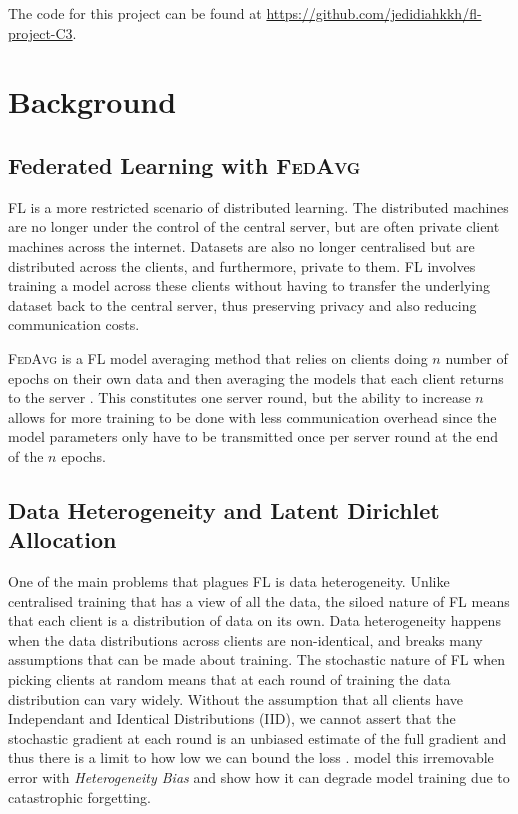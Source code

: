 \documentclass{article}
\newcommand*{\fedavg}{\textsc{FedAvg}}
\begin{document}
The code for this project can be found at \url{https://github.com/jedidiahkkh/fl-project-C3}.

\section{Background}
\subsection{Federated Learning with \fedavg}
FL is a more restricted scenario of distributed learning. The distributed machines are no longer under the control of the central server, but are often private client machines across the internet. Datasets are also no longer centralised but are distributed across the clients, and furthermore, private to them. FL involves training a model across these clients without having to transfer the underlying dataset back to the central server, thus preserving privacy and also reducing communication costs.

\fedavg{} is a FL model averaging method that relies on clients doing $n$ number of epochs on their own data and then averaging the models that each client returns to the server \cite{mcmahanCommunicationEfficientLearningDeep2017}. This constitutes one server round, but the ability to increase $n$ allows for more training to be done with less communication overhead since the model parameters only have to be transmitted once per server round at the end of the $n$ epochs.

\subsection{Data Heterogeneity and Latent Dirichlet Allocation}
One of the main problems that plagues FL is data heterogeneity. Unlike centralised training that has a view of all the data, the siloed nature of FL means that each client is a distribution of data on its own. Data heterogeneity happens when the data distributions across clients are non-identical, and breaks many assumptions that can be made about training. The stochastic nature of FL when picking clients at random means that at each round of training the data distribution can vary widely. Without the assumption that all clients have Independant and Identical Distributions (IID), we cannot assert that the stochastic gradient at each round is an unbiased estimate of the full gradient \cite{zhaoFederatedLearningNonIID2018} and thus there is a limit to how low we can bound the loss \cite{karimireddySCAFFOLDStochasticControlled2021}. \citet{zhouUnderstandingImprovingModel2023} model this irremovable error with \emph{Heterogeneity Bias} and show how it can degrade model training due to catastrophic forgetting.
\end{document}
